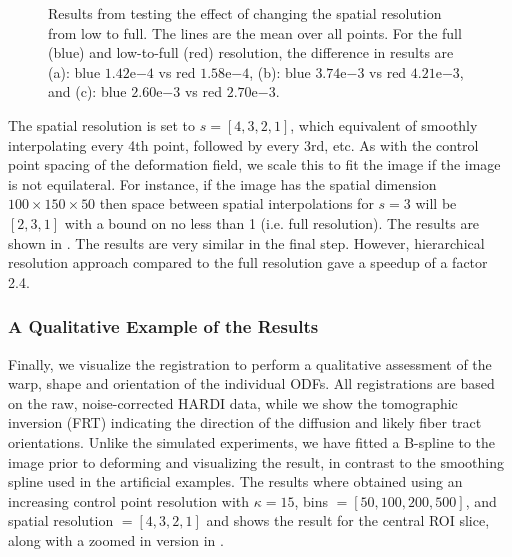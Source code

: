 \documentclass[twocolumn]{svjour3}
\begin{document}
\begin{figure}[!htb]
  \caption{Results from testing the effect of changing the spatial resolution from low to
    full. The lines are the mean over all points. For the full (blue) and low-to-full
    (red) resolution, the difference in results are (a): blue $1.42\mathrm{e}{-4}$ vs red
    $1.58\mathrm{e}{-4}$, (b): blue $3.74\mathrm{e}{-3}$ vs red $4.21\mathrm{e}{-3}$, and
    (c): blue $2.60\mathrm{e}{-3}$ vs red $2.70\mathrm{e}{-3}$.}
  \label{fig:spatialtest}
\end{figure}
The spatial resolution is set to $s=[4,3,2,1]$, which equivalent of smoothly interpolating
every 4th point, followed by every 3rd, etc. As with the control point spacing of the
deformation field, we scale this to fit the image if the image is not equilateral. For
instance, if the image has the spatial dimension $100\times150\times50$ then space between
spatial interpolations for $s=3$ will be $[2,3,1]$ with a bound on no less than 1
(i.e. full resolution). The results are shown in . The results are
very similar in the final step. However, hierarchical resolution approach compared to the
full resolution gave a speedup of a factor 2.4.

\subsubsection{A Qualitative Example of the Results}
\label{subsec:qualitativeresult}

Finally, we visualize the registration to perform a qualitative assessment of the warp,
shape and orientation of the individual ODFs. All registrations are based on the raw,
noise-corrected HARDI data, while we show the tomographic inversion (FRT) indicating the
direction of the diffusion and likely fiber tract orientations. Unlike the simulated
experiments, we have fitted a B-spline to the image prior to deforming and visualizing the
result, in contrast to the smoothing spline used in the artificial examples. The results
where obtained using an increasing control point resolution with $\kappa=15$, bins
$=[50,100,200,500]$, and spatial resolution $=[4,3,2,1]$ and 
shows the result for the central ROI slice, along with a zoomed in version in
.
\end{document}
